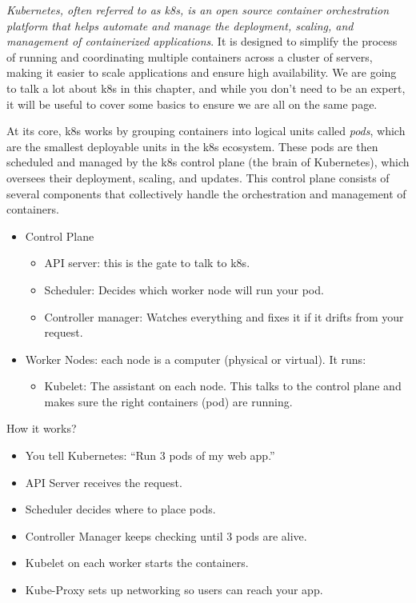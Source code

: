 \textit{Kubernetes, often referred to as k8s, is an open source container orchestration platform that helps automate and manage the deployment, scaling, and management of containerized applications}. It is designed to simplify the process of running and coordinating multiple containers across a cluster of servers, making it easier to scale applications and ensure high availability. We are going to talk a lot about k8s in this chapter, and while you don't need to be an expert, it will be useful to cover some basics to ensure we are all on the same page.

At its core, k8s works by grouping containers into logical units called \textit{pods}, which are the smallest deployable units in the k8s ecosystem. These pods are then scheduled and managed by the k8s control plane (\ie the brain of Kubernetes), which oversees their deployment, scaling, and updates. This control plane consists of several components that collectively handle the orchestration and management of containers. 

\begin{itemize}
	\item Control Plane
		\begin{itemize}
			\item API server: this is the gate to talk to k8s. 
			\item Scheduler: Decides which worker node will run your pod.
			\item Controller manager: Watches everything and fixes it if it drifts from your request.
		\end{itemize}
	\item Worker Nodes: each node is a computer (physical or virtual). It runs:
		\begin{itemize}
			\item Kubelet: The assistant on each node. This talks to the control plane and makes sure the right containers (\ie pod) are running. 
		\end{itemize}
\end{itemize}

How it works?
\begin{itemize}
	\item You tell Kubernetes: ``Run 3 pods of my web app.''
	\item API Server receives the request.
	\item Scheduler decides where to place pods.
	\item Controller Manager keeps checking until 3 pods are alive.
	\item Kubelet on each worker starts the containers.
	\item Kube-Proxy sets up networking so users can reach your app.
\end{itemize}

